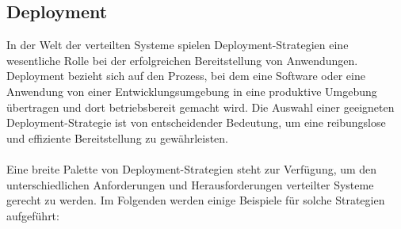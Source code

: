 \subsection{Deployment}

In der Welt der verteilten Systeme spielen Deployment-Strategien eine wesentliche Rolle bei der erfolgreichen Bereitstellung von Anwendungen. Deployment bezieht sich auf den Prozess, bei dem eine Software oder eine Anwendung von einer Entwicklungsumgebung in eine produktive Umgebung übertragen und dort betriebsbereit gemacht wird. Die Auswahl einer geeigneten Deployment-Strategie ist von entscheidender Bedeutung, um eine reibungslose und effiziente Bereitstellung zu gewährleisten.
\\\\
Eine breite Palette von Deployment-Strategien steht zur Verfügung, um den unterschiedlichen Anforderungen und Herausforderungen verteilter Systeme gerecht zu werden. Im Folgenden werden einige Beispiele für solche Strategien aufgeführt:
